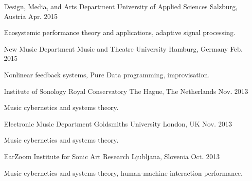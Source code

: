 \begin{cventries}
  \cventry
    {Design, Media, and Arts Department} %
    {University of Applied Sciences} %
    {Salzburg, Austria} %
    {Apr. 2015} %
    {
      \begin{cvitems} %
        \item {Ecosystemic performance theory and applications, adaptive signal processing.}
      \end{cvitems}
    }

  \cventry
    {New Music Department} %
    {Music and Theatre University} %
    {Hamburg, Germany} %
    {Feb. 2015} %
    {
      \begin{cvitems} %
        \item {Nonlinear feedback systems, Pure Data programming, improvisation.}
      \end{cvitems}
    }

  \cventry
    {Institute of Sonology} %
    {Royal Conservatory} %
    {The Hague, The Netherlands} %
    {Nov. 2013} %
    {
      \begin{cvitems} %
        \item {Music cybernetics and systems theory.}
      \end{cvitems}
    }

  \cventry
    {Electronic Music Department} %
    {Goldsmiths University} %
    {London, UK} %
    {Nov. 2013} %
    {
      \begin{cvitems} %
        \item {Music cybernetics and systems theory.}
      \end{cvitems}
    }

  \cventry
    {EarZoom} %
    {Institute for Sonic Art Research} %
    {Ljubljana, Slovenia} %
    {Oct. 2013} %
    {
      \begin{cvitems} %
        \item {Music cybernetics and systems theory, human-machine interaction performance.}
      \end{cvitems}
    }


\end{cventries}
